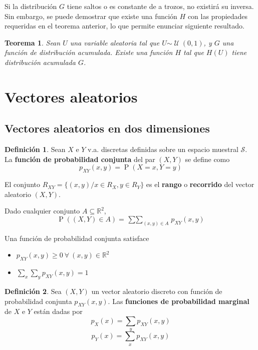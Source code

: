 \documentclass[11pt]{article}
\theoremstyle{plain}
\newtheorem*{teo}{Teorema}
\theoremstyle{definition}
\newtheorem*{defi}{Definición}
\theoremstyle{remark}
\newcommand{\deft}[1]{\textbf{#1}}  %
\newcommand{\proba}{\ensuremath{\operatorname{P}}}  %
\newcommand{\espm}[0]{\ensuremath{\mathcal{S}}}  %
\newcommand{\foralle}{\ensuremath{\forall \ }}  %
\newcommand{\dist}[1]{\ensuremath{\sim \operatorname{#1}}}  %
\newcommand{\unif}[0]{\ensuremath{\mathcal{U}}}  %
\begin{document}
    Si la distribución $G$ tiene saltos o es constante de a trozos, no existirá su inversa. Sin embargo, se puede demostrar que existe una función $H$ con las propiedades requeridas en el teorema anterior, lo que permite enunciar siguiente resultado.

    \begin{teo}
      Sean $U$ una variable aleatoria tal que $U \dist{\unif}(0,1)$, y $G$ una función de distribución acumulada. Existe una función $H$ tal que $H(U)$ tiene distribución acumulada $G$.
    \end{teo}

\section{Vectores aleatorios}

  \subsection{Vectores aleatorios en dos dimensiones}

    \begin{defi}
      Sean $X$ e $Y$ v.a. discretas definidas sobre un espacio muestral $\espm$. La \deft{función de probabilidad conjunta} del par $(X,Y)$ se define como
      \[ p_{XY}(x,y) = \proba(X = x, Y = y) \]

      El conjunto $R_{XY} = \lbrace (x,y) / x \in R_X, y \in R_Y \rbrace$ es el \deft{rango} o \deft{recorrido} del vector aleatorio $(X,Y)$.
    \end{defi}

    Dado cualquier conjunto $A \subseteq \mathbb{R}^2$,
    \[ \proba((X,Y) \in A) = \mathop{\sum \sum}_{(x,y) \in A} p_{XY}(x,y) \]

    Una función de probabilidad conjunta satisface
    \begin{itemize}
      \item $p_{XY}(x,y) \geq 0 \ \foralle (x,y) \in \mathbb{R}^2$
      \item $\sum_x \sum_y p_{XY}(x,y) = 1$
    \end{itemize}

    \begin{defi}
      Sea $(X,Y)$ un vector aleatorio discreto con función de probabilidad conjunta $p_{XY}(x,y)$. Las \deft{funciones de probabilidad marginal} de $X$ e $Y$ están dadas por
      \[ p_X(x) = \sum_y p_{XY}(x,y) \]
      \[ p_Y(x) = \sum_x p_{XY}(x,y) \]
    \end{defi}
\end{document}
